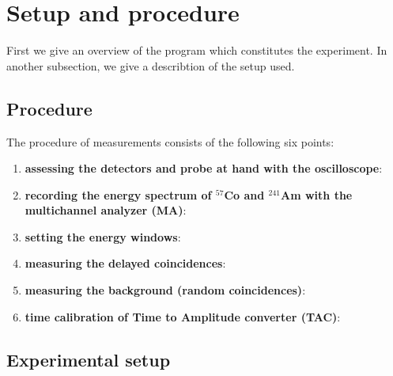 \section{Setup and procedure}
First we give an overview of the program which constitutes the experiment. In another subsection, 
we give a describtion of the setup used. 
\subsection{Procedure}
The procedure of measurements consists of the following six points:
\begin{enumerate}
    \item 
        \textbf{assessing the detectors and probe at hand with the oscilloscope}:
    \item 
        \textbf{recording the energy spectrum of $^{57}$Co and $^{241}$Am with the multichannel analyzer (MA)}:
    \item
        \textbf{setting the energy windows}:
    \item
        \textbf{measuring the delayed coincidences}:
    \item
        \textbf{measuring the background (random coincidences)}:
    \item
        \textbf{time calibration of Time to Amplitude converter (TAC)}:
\end{enumerate}






\subsection{Experimental setup}


